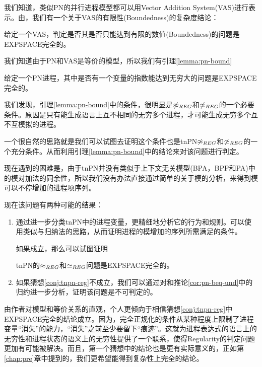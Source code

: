 我们知道，类似PN的并行进程模型都可以用Vector Addition System(VAS)进行表示。由\cite{Rackoff1978,Cardoza1976}，我们有一个关于VAS的有限性(Boundedness)的复杂度结论：

\begin{lem}\label{lemma:vas}
给定一个VAS，判定是否其是否只能达到有限的数值(Boundedness)的问题是EXPSPACE完全的。
\end{lem}

我们知道由于PN和VAS是等价的模型，所以我们有引理\ref{lemma:pn-bound}

\begin{lem}\label{lemma:pn-bound}
给定一个PN进程，其中是否有一个变量的指数能达到无穷大的问题是EXPSPACE完全的。
\end{lem}

我们发现，引理\ref{lemma:pn-bound}中的条件，很明显是$\not\approx_{REG}$和$\not\simeq_{REG}$的一个必要条件。原因是只有能生成语言上互不相同的无穷多个进程，才可能生成无穷多个互不互模拟的进程。

一个很自然的思路就是我们可以试图去证明这个条件也是tnPN$\not\approx_{REG}$和$\not\simeq_{REG}$的一个充分条件。从而利用引理\ref{lemma:pn-bound}中的结论来对该问题进行判定。

现在遇到的困难是，由于tnPN并没有类似于上下文无关模型(BPA，BPP和PA)中的模对加法的同余性，所以我们没有办法直接通过简单的关于模的分析，来得到模可以不停增加的进程项序列。

现在该问题有两种可能的结果：

\begin{enumerate}
	\item 通过进一步分类tnPN中的进程变量，更精细地分析它的行为和规则。可以使用类似与归纳法的思路，从而证明进程的模增加的序列所需满足的条件。

如果成立，那么可以试图证明

\begin{conj}\label{conj:tnpn-reg}
tnPN的$\approx_{REG}$和$\simeq_{REG}$问题是EXPSPACE完全的。
\end{conj}

	\item 如果猜想\ref{conj:tnpn-reg}不成立，我们可以通过对\cite{Jancar1996}和推论\ref{cor:pn-beq-und}中的归约进一步分析，证明该问题是不可判定的。
\end{enumerate}

由作者对模型和等价关系的直观，个人更倾向于相信猜想\ref{conj:tnpn-reg}中EXPSPACE完全的结论成立。因为，完全正规化的条件从某种程度上限制了进程变量``消失''的能力，``消失''之前至少要留下``痕迹''。这就为进程表达式的语言上的无穷性和进程状态的语义上的无穷性提供了一个联系，使得Regularity的判定问题更加有可能被解决。而且，第一个猜想中的结论也是更有实际意义的，正如第\ref{chap:pre}章中提到的，我们更希望能得到复杂性上完全的结论。


